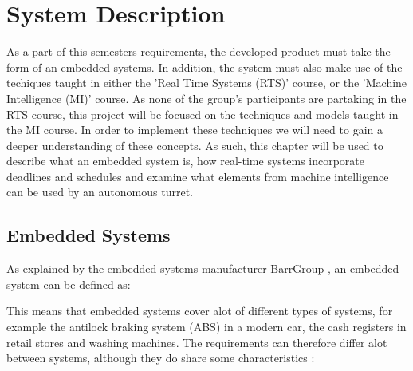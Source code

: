 \chapter{System Description}\label{SystemDescription}
As a part of this semesters requirements, the developed product must take the
form of an embedded systems. In addition, the system must also make use of the
techiques taught in either the 'Real Time Systems (RTS)' course, or the 'Machine
Intelligence (MI)' course. As none of the group's participants are partaking in
the RTS course, this project will be focused on the techniques and models taught in
the MI course. In order to implement these techniques we will need to gain a
deeper understanding of these concepts. As such, this chapter will be used to
describe what an embedded system is, how real-time systems incorporate deadlines
and schedules and examine what elements from machine intelligence can be used
by an autonomous turret.

\section{Embedded Systems}
As explained by the embedded systems manufacturer BarrGroup
\citep{Barr_Embedded}, an embedded system can be defined as: \nl

\begin{center}
\begin{minipage}{0.8\linewidth}
\end{minipage}
\end{center}
% 

This means that embedded systems cover alot of different types of systems, for
example the antilock braking system (ABS) in a modern car, the cash registers in
retail stores and washing machines. The requirements can therefore differ alot
between systems, although they do share some characteristics \citep[ch.1.1]{vahid1999embedded}:

